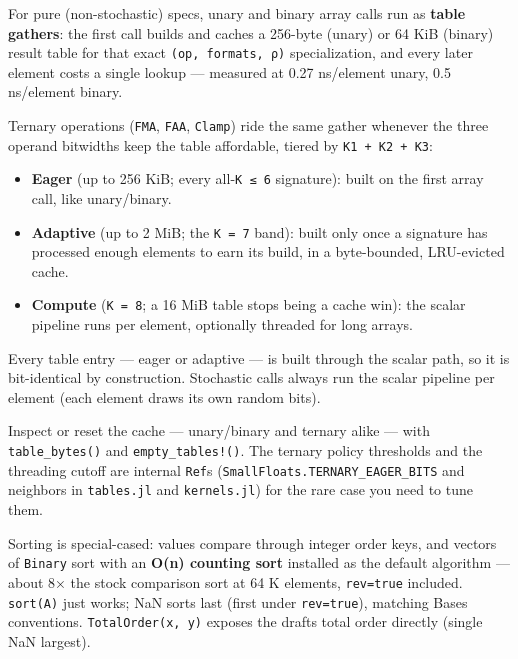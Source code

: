 For pure (non-stochastic) specs, unary and binary array calls run as \textbf{table gathers}: the first call builds and caches a 256-byte (unary) or 64 KiB (binary) result table for that exact \texttt{(op, formats, ρ)} specialization, and every later element costs a single lookup — measured at 0.27 ns/element unary, 0.5 ns/element binary.



Ternary operations (\texttt{FMA}, \texttt{FAA}, \texttt{Clamp}) ride the same gather whenever the three operand bitwidths keep the table affordable, tiered by \texttt{K1 + K2 + K3}:



\begin{itemize}
\item \textbf{Eager} (up to 256 KiB; every all-\texttt{K ≤ 6} signature): built on the first array call, like unary/binary.


\item \textbf{Adaptive} (up to 2 MiB; the \texttt{K = 7} band): built only once a signature has processed enough elements to earn its build, in a byte-bounded, LRU-evicted cache.


\item \textbf{Compute} (\texttt{K = 8}; a 16 MiB table stops being a cache win): the scalar pipeline runs per element, optionally threaded for long arrays.

\end{itemize}


Every table entry — eager or adaptive — is built through the scalar path, so it is bit-identical by construction. Stochastic calls always run the scalar pipeline per element (each element draws its own random bits).



Inspect or reset the cache — unary/binary and ternary alike — with \texttt{table\_bytes()} and \texttt{empty\_tables!()}. The ternary policy thresholds and the threading cutoff are internal \texttt{Ref}s (\texttt{SmallFloats.TERNARY\_EAGER\_BITS} and neighbors in \texttt{tables.jl} and \texttt{kernels.jl}) for the rare case you need to tune them.



Sorting is special-cased: values compare through integer order keys, and vectors of \texttt{Binary} sort with an \textbf{O(n) counting sort} installed as the default algorithm — about 8× the stock comparison sort at 64 K elements, \texttt{rev=true} included. \texttt{sort(A)} just works; NaN sorts last (first under \texttt{rev=true}), matching Base{\textquotesingle}s conventions. \texttt{TotalOrder(x, y)} exposes the draft{\textquotesingle}s total order directly (single NaN largest).



